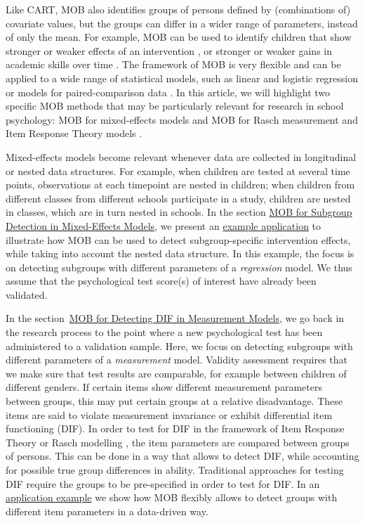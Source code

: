 \documentclass[doc,floatsintext,natbib]{apa7}
\begin{document}
Like CART, MOB also identifies groups of persons defined by (combinations of) covariate values, but the groups can differ in a wider range of parameters, instead of only the mean. For example, MOB can be used to identify children that show stronger or weaker effects of an intervention \citep{ChunyAnso21}, or stronger or weaker gains in academic skills over time \citep{FokkyZeil24}. The framework of MOB is very flexible and can be applied to a wide range of statistical models, such as %
linear and logistic regression \citep{KopAugStr:2013,ZeilyHoth08} or models for paired-comparison data \citep{StrWicZei:2011:JoEaBS,WiedyFrick21}. In this article, we will highlight two specific MOB methods that may be particularly relevant for research in school psychology: MOB for mixed-effects models \citep{FokkySmit18} and MOB for Rasch measurement and Item Response Theory models \citep[IRT,][]{StroyKopf15, KomStrZei:2017:EaPM, HennyDeba23}. 

Mixed-effects models become relevant whenever data are collected in longitudinal or nested data structures. For example, when children are tested at several time points, observations at each timepoint are nested in children; when children from different classes from different schools participate in a study, children are nested in classes, which are in turn nested in schools. In the section \hyperref[sec:glmmtree]{MOB for Subgroup Detection in Mixed-Effects Models}, we present an \hyperref[sec:TutorialMixed]{example application} to illustrate how MOB can be used to detect subgroup-specific intervention effects, while taking into account the nested data structure. In this example, the focus is on detecting subgroups with different parameters of a \textit{regression} model. We thus assume that the psychological test score(s) of interest have already been validated. 

In the section~\hyperref[sec:raschtree]{MOB for Detecting DIF in Measurement Models}, we go back in the research process to the point where a new psychological test has been administered to a validation sample. Here, we focus on detecting subgroups with different parameters of a \textit{measurement} model. Validity assessment requires that we make sure that test results are comparable, for example between children of different genders. If certain items show different measurement parameters between groups, this may put certain groups at a relative disadvantage. These items are said to violate measurement invariance or exhibit differential item functioning (DIF). In order to test for DIF in the framework of Item Response Theory or Rasch modelling \citep{AnthyDiPe16,DebStrZei:2022:CRC,Mall97}, the item parameters are compared between groups of persons. This can be done in a way that allows to detect DIF, while accounting for possible true group differences in ability. Traditional approaches for testing DIF require the groups to be pre-specified in order to test for DIF. In an \hyperref[sec:TutorialRasch]{application example} we show how MOB flexibly allows to detect groups with different item parameters in a data-driven way. 
\end{document}
